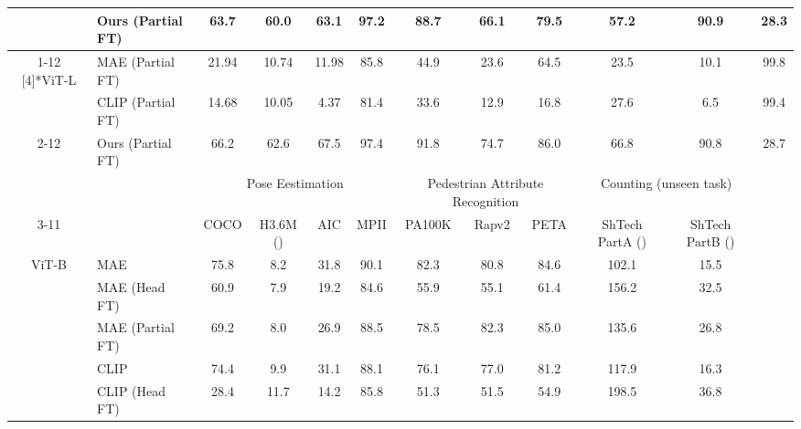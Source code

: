 \documentclass[10pt,twocolumn,letterpaper]{article}
\begin{document}
\begin{table*}[t]
\begin{tabular}{cl|cccccccccc}
          & Ours (Partial FT) & 63.7  & 60.0  & 63.1  & \cellcolor[rgb]{ .949,  .949,  .949} 97.2  & 88.7  & 66.1  & 79.5  & \cellcolor[rgb]{ .949,  .949,  .949} 57.2  & 90.9  & \cellcolor[rgb]{ .949,  .949,  .949} 28.3  \\
\cmidrule{1-12}    \multirow{3}[4]{*}{ViT-L} & MAE (Partial FT) & 21.94 & 10.74 & 11.98 & \cellcolor[rgb]{ .949,  .949,  .949} 85.8  & 44.9  & 23.6  & 64.5  & \cellcolor[rgb]{ .949,  .949,  .949} 23.5  & 10.1  & \cellcolor[rgb]{ .949,  .949,  .949} 99.8  \\
          & CLIP (Partial FT) & 14.68 & 10.05 & 4.37  & \cellcolor[rgb]{ .949,  .949,  .949} 81.4  & 33.6  & 12.9  & 16.8  & \cellcolor[rgb]{ .949,  .949,  .949} 27.6  & 6.5   & \cellcolor[rgb]{ .949,  .949,  .949} 99.4  \\
\cmidrule{2-12}          & Ours (Partial FT) & 66.2  & 62.6  & 67.5  & \cellcolor[rgb]{ .949,  .949,  .949} 97.4  & 91.8  & 74.7  & 86.0  & \cellcolor[rgb]{ .949,  .949,  .949} 66.8  & 90.8  & \cellcolor[rgb]{ .949,  .949,  .949} 28.7  \\
    \midrule
          &       & \multicolumn{4}{c}{Pose Eestimation} & \multicolumn{3}{c}{Pedestrian Attribute Recognition} & \multicolumn{2}{c}{Counting (unseen task)} &  \\
\cmidrule{3-11}          &       & COCO  & H3.6M () & AIC   & \cellcolor[rgb]{ .949,  .949,  .949} MPII & PA100K & Rapv2 & \cellcolor[rgb]{ .949,  .949,  .949} PETA & ShTech PartA () & ShTech PartB () &  \\
    \multirow{9}[4]{*}{ViT-B} & MAE   & 75.8  & 8.2   & 31.8  & \cellcolor[rgb]{ .949,  .949,  .949} 90.1  & 82.3  & 80.8  & \cellcolor[rgb]{ .949,  .949,  .949} 84.6  & 102.1  & 15.5  &  \\
          & MAE (Head FT) & 60.9  & 7.9   & 19.2  & \cellcolor[rgb]{ .949,  .949,  .949} 84.6  & 55.9  & 55.1  & \cellcolor[rgb]{ .949,  .949,  .949} 61.4  & 156.2  & 32.5  &  \\
          & MAE (Partial FT) & 69.2  & 8.0   & 26.9  & \cellcolor[rgb]{ .949,  .949,  .949} 88.5  & 78.5  & 82.3  & \cellcolor[rgb]{ .949,  .949,  .949} 85.0  & 135.6  & 26.8  &  \\
\cmidrule{2-12}          & CLIP  & 74.4  & 9.9   & 31.1  & \cellcolor[rgb]{ .949,  .949,  .949} 88.1  & 76.1  & 77.0  & \cellcolor[rgb]{ .949,  .949,  .949} 81.2  & 117.9  & 16.3  &  \\
          & CLIP (Head FT) & 28.4  & 11.7  & 14.2  & \cellcolor[rgb]{ .949,  .949,  .949} 85.8  & 51.3  & 51.5  & \cellcolor[rgb]{ .949,  .949,  .949} 54.9  & 198.5  & 36.8  &  \\

\end{tabular}
\end{table*}
\end{document}
